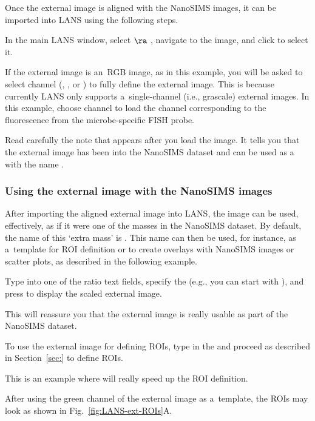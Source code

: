 \goldbox{}
Once the external image is aligned with the NanoSIMS images, it can be imported into LANS using the following steps.
\tcbe

\s In the main LANS window, select  $\ra$ , navigate to the image, and click  to select it. 

\nb\bul If the external image is an~RGB image, as in this example, you will be asked to select  channel (, , or ) to fully define the external image. This is because currently LANS only supports a~single-channel (i.e., grascale) external images. In this example, choose channel  to load the channel corresponding to the fluorescence from the microbe-specific FISH probe.

\s Read carefully the note that appears after you load the image. It tells you that the external image has been  into the NanoSIMS dataset and can be used as a~ with the name .


\subsubsection{Using the external image with the NanoSIMS images}
\setcounter{step}{0}

\goldbox{}
After importing the aligned external image into LANS, the image can be used, effectively, as if it were one of the masses in the NanoSIMS dataset. By default, the name of this `extra mass' is . This name can then be used, for instance, as a~template for ROI definition or to create overlays with NanoSIMS images or scatter plots, as described in the following example.
\tcbe

\s Type  into one of the ratio  text fields, specify the  (e.g., you can start with \ttt{[0 1]}), and press  to display the scaled external image.

\nb\bul This will reassure you that the external image is really usable as part of the NanoSIMS dataset.

\s To use the external image for defining ROIs, type  in the  and proceed as described in Section~\ref{sec:} to define ROIs.

\nb\bul This is an example where  will really speed up the  ROI definition.

\bul After using the green channel of the external image as a~template, the ROIs may look as shown in Fig.~\ref{fig:LANS-ext-ROIs}A.

